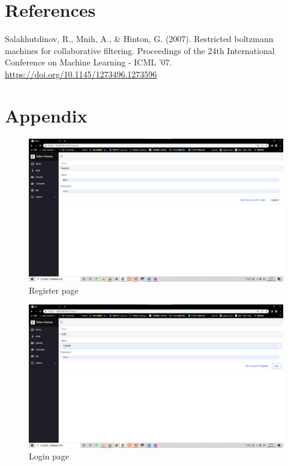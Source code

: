 \begin{CJK*}{UTF8}{gbsn}
\section{References}
Salakhutdinov, R., Mnih, A., \& Hinton, G. (2007). Restricted boltzmann machines for collaborative filtering. Proceedings of the 24th International Conference on Machine Learning - ICML '07. \href{https://doi.org/10.1145/1273496.1273596}{https://doi.org/10.1145/1273496.1273596}
\newpage
\section{Appendix}
\begin{figure}[htbp]
    \centering
    \includegraphics[width=1\textwidth]{reg.png}
    \caption{Register page}
    \end{figure}
    
    \begin{figure}[htbp]
    \centering
    \includegraphics[width=1\textwidth]{res_login.png}
    \caption{Login page}
    \end{figure}
    

\end{CJK*}
